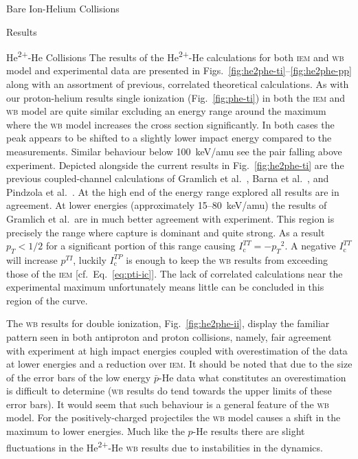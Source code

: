 \documentclass[letterpaper, 11 pt]{report}
\begin{document}
\begin{chapter}{Bare Ion-Helium Collisions \label{chap:p-he2p-he}}
\begin{section}{Results \label{sec:phe2p-res}}
\begin{subsection}{\texorpdfstring{He\textsuperscript{2+}}{He2+}-He Collisions
                         \label{sec:he2phe-res}}
         The results of the He\textsuperscript{2+}-He calculations for both \textsc{iem} and \textsc{wb}
         model and experimental data are presented in Figs.~\ref{fig:he2phe-ti}--\ref{fig:he2phe-pp}
         along with an assortment of previous, correlated theoretical calculations. As with our
         proton-helium results single ionization (Fig.~\ref{fig:phe-ti}) in both the \textsc{iem} and
         \textsc{wb} model are quite similar excluding an energy range around the maximum where the
         \textsc{wb} model increases the cross section significantly. In both cases the peak appears to
         be shifted to a slightly lower impact energy compared to the measurements. Similar behaviour
         below 100~keV/amu see the pair falling above experiment. Depicted alongside the current results
         in Fig.~\ref{fig:he2phe-ti} are the previous coupled-channel calculations of Gramlich et
         al.~\cite{GGS-89}, Barna et al.~\cite{BTB-05}, and Pindzola et al.~\cite{PRC-07}. At the high
         end of the energy range explored all results are in agreement. At lower energies (approximately
         15--80~keV/amu) the results of Gramlich et al.\ are in much better agreement with experiment.
         This region is precisely the range where capture is dominant and quite strong. As a result
         $p_T < 1/2$ for a significant portion of this range causing $I^{TT}_\mathrm{c} = -{p_T}^2$. A
         negative $I^{TT}_\mathrm{c}$ will increase $p^{TI}$, luckily $I^{TP}_\mathrm{c}$ is enough to
         keep the \textsc{wb} results from exceeding those of the \textsc{iem} [cf.\
         Eq.~\eqref{eq:pti-ic}]. The lack of correlated calculations near the experimental maximum
         unfortunately means little can be concluded in this region of the curve.

         The \textsc{wb} results for double ionization, Fig.~\ref{fig:he2phe-ii}, display the familiar
         pattern seen in both antiproton and proton collisions, namely, fair agreement with experiment
         at high impact energies coupled with overestimation of the data at lower energies and a
         reduction over \textsc{iem}. It should be noted that due to the size of the error bars of the
         low energy $\bar{p}$-He data what constitutes an overestimation is difficult to determine
         (\textsc{wb} results do tend towards the upper limits of these error bars). It would seem that
         such behaviour is a general feature of the \textsc{wb} model. For the positively-charged
         projectiles the \textsc{wb} model causes a shift in the maximum to lower energies. Much like
         the $p$-He results there are slight fluctuations in the He\textsuperscript{2+}-He \textsc{wb}
         results due to instabilities in the dynamics.


\end{subsection}
\end{section}
\end{chapter}
\end{document}
